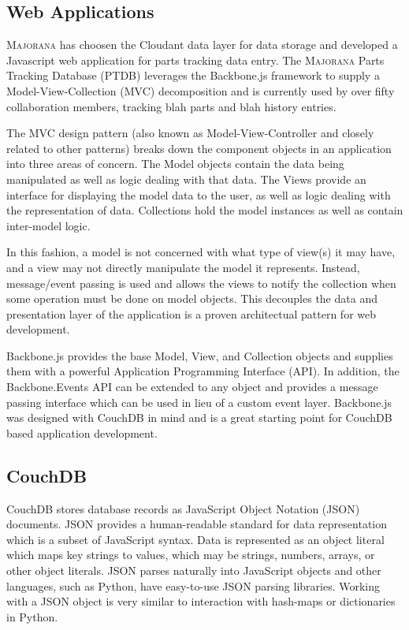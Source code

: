 \documentclass[journal]{IEEEtran}
\begin{document}
\subsection{Web Applications}
\textsc{Majorana} has choosen the Cloudant data layer for data storage and developed a Javascript web application
for parts tracking data entry. The \textsc{Majorana} Parts Tracking Database (PTDB) leverages the Backbone.js
framework to supply a Model-View-Collection (MVC) decomposition and is currently used by over fifty
collaboration members, tracking blah parts and blah history entries.

The MVC design pattern (also known as Model-View-Controller and closely related to other patterns) breaks
down the component objects in an application into three areas of concern. The Model objects contain 
the data being manipulated as well as logic dealing with that data. The Views provide an interface for
displaying the model data to the user, as well as logic dealing with the representation of data. 
Collections hold the model instances as well as contain inter-model logic.

In this fashion, a model is not concerned with what type of view(s) it may have, and a view may 
not directly manipulate the model it represents. Instead, message/event passing is used and allows
the views to notify the collection when some operation must be done on model objects. This decouples
the data and presentation layer of the application is a proven architectual pattern for web development.

Backbone.js provides the base Model, View, and Collection objects and supplies them with a powerful Application Programming Interface (API).
In addition, the Backbone.Events API can be extended to any object and provides a message passing interface
which can be used in lieu of a custom event layer. Backbone.js was designed with CouchDB in mind and is
a great starting point for CouchDB based application development.

\subsection{CouchDB}
CouchDB stores database records as JavaScript Object Notation (JSON) documents. JSON provides a human-readable
standard for data representation which is a subset of JavaScript syntax. Data is represented as an object
literal which maps key strings to values, which may be strings, numbers, arrays, or other object literals. 
JSON parses naturally into JavaScript objects and other languages, such as Python, have easy-to-use
JSON parsing libraries. Working with a JSON object is very similar to interaction with hash-maps or 
dictionaries in Python.
\end{document}

